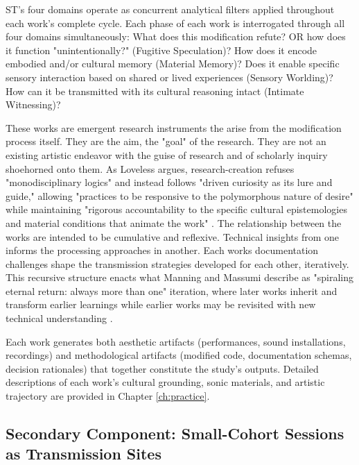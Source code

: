 ST's four domains operate as concurrent analytical filters applied throughout each work's complete cycle.  Each phase of each work is interrogated through all four domains simultaneously: What does this modification refute? OR how does it function "unintentionally?" (Fugitive Speculation)? How does it encode embodied and/or cultural memory (Material Memory)? Does it enable specific sensory interaction based on shared or lived experiences (Sensory Worlding)? How can it be transmitted with its cultural reasoning intact (Intimate Witnessing)?

These works are emergent research instruments the arise from the modification process itself. They are the aim, the "goal" of the research. They are not an existing artistic endeavor with the guise of research and of scholarly inquiry shoehorned onto them. As Loveless argues, research-creation refuses "monodisciplinary logics" and instead follows "driven curiosity as its lure and guide," allowing "practices to be responsive to the polymorphous nature of desire" while maintaining "rigorous accountability to the specific cultural epistemologies and material conditions that animate the work" \parencites[62, 105]{Loveless_2019}. The relationship between the works are intended to be cumulative and reflexive. Technical insights from one informs the processing approaches in another. Each works documentation challenges shape the transmission strategies developed for each other, iteratively. This recursive structure enacts what Manning and Massumi describe as "spiraling eternal return: always more than one" iteration, where later works inherit and transform earlier learnings while earlier works may be revisited with new technical understanding \parencites[131]{Manning_Massumi_2014}.

Each work generates both aesthetic artifacts (performances, sound installations, recordings) and methodological artifacts (modified code, documentation schemas, decision rationales) that together constitute the study's outputs. Detailed descriptions of each work's cultural grounding, sonic materials, and artistic trajectory are provided in Chapter \ref{ch:practice}.

\subsection{Secondary Component: Small-Cohort Sessions as Transmission Sites}

